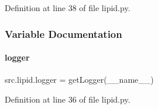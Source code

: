 Definition at line 38 of file lipid.\+py.



\subsubsection{Variable Documentation}
\mbox{\label{namespacesrc_1_1lipid_aae9ad8fd26bbf42838d626ced6295a26}} 
\paragraph{\texorpdfstring{logger}{logger}}
{\footnotesize\ttfamily src.\+lipid.\+logger = get\+Logger(\+\_\+\+\_\+name\+\_\+\+\_\+)}



Definition at line 36 of file lipid.\+py.

